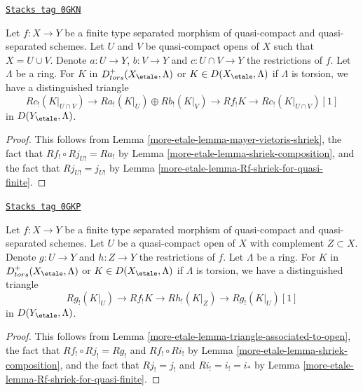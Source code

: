 \begin{lemma}
\label{more-etale-lemma-relative-mayer-vietoris}
\href{https://stacks.math.columbia.edu/tag/0GKN}{\texttt{Stacks tag 0GKN}}

Let $f : X \to Y$ be a finite type separated morphism of quasi-compact and
quasi-separated schemes. Let $U$ and $V$ be quasi-compact opens of $X$
such that $X = U \cup V$. Denote $a : U \to Y$, $b : V \to Y$ and
$c : U \cap V \to Y$ the restrictions of $f$. Let $\Lambda$ be a ring.
For $K$ in $D^+_{tors}(X_\etale, \Lambda)$ or $K \in D(X_\etale, \Lambda)$
if $\Lambda$ is torsion, we have a distinguished triangle
$$
Rc_!(K|_{U \cap V}) \to
Ra_!(K|_U) \oplus Rb_!(K|_V) \to
Rf_!K \to
Rc_!(K|_{U \cap V})[1]
$$
in $D(Y_\etale, \Lambda)$.
\end{lemma}

\begin{proof}
This follows from Lemma \ref{more-etale-lemma-mayer-vietoris-shriek},
the fact that $Rf_! \circ Rj_{U!} = Ra_!$ by
Lemma \ref{more-etale-lemma-shriek-composition}, and the fact that
$Rj_{U!} = j_{U!}$ by Lemma \ref{more-etale-lemma-Rf-shriek-for-quasi-finite}.
\end{proof}

\begin{lemma}
\label{more-etale-lemma-relative-triangle-associated-to-open}
\href{https://stacks.math.columbia.edu/tag/0GKP}{\texttt{Stacks tag 0GKP}}

Let $f : X \to Y$ be a finite type separated morphism of quasi-compact and
quasi-separated schemes. Let $U$ be a quasi-compact open of $X$ with
complement $Z \subset X$.  Denote $g : U \to Y$ and $h : Z \to Y$
the restrictions of $f$. Let $\Lambda$ be a ring.
For $K$ in $D^+_{tors}(X_\etale, \Lambda)$ or $K \in D(X_\etale, \Lambda)$
if $\Lambda$ is torsion, we have a distinguished triangle
$$
Rg_!(K|_U) \to
Rf_!K \to
Rh_!(K|_Z) \to
Rg_!(K|_U)[1]
$$
in $D(Y_\etale, \Lambda)$.
\end{lemma}

\begin{proof}
This follows from
Lemma \ref{more-etale-lemma-triangle-associated-to-open},
the fact that $Rf_! \circ Rj_! = Rg_!$ and $Rf_! \circ Ri_!$ by
Lemma \ref{more-etale-lemma-shriek-composition}, and the fact that
$Rj_! = j_!$ and $Ri_! = i_! = i_*$ by
Lemma \ref{more-etale-lemma-Rf-shriek-for-quasi-finite}.
\end{proof}

